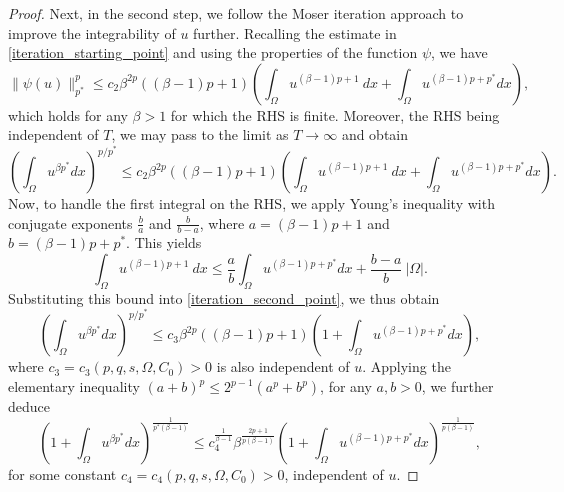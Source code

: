 \documentclass[reqno,oneside]{amsart}
\theoremstyle{definition}
\theoremstyle{remark}
\numberwithin{equation}{section}
\newcommand{\Om} {\Omega}
\newcommand{\rar}{\rightarrow}
\begin{document}
\begin{proof}
    Next, in the second step, we follow the Moser iteration approach to improve the integrability of $u$ further. Recalling the estimate in \eqref{iteration_starting_point} and using the properties of the function $\psi$, we have
    \begin{equation}
        \|\psi (u)\|^p_{p^*} \leq c_2 \beta^{2p} \left((\beta -1)p +1 \right) \left( \int_{\Om} u^{(\beta -1)p +1}\ dx + \int_{\Om} u^{(\beta -1)p + p^*} dx \right),
    \end{equation}
    which holds for any $\beta>1$ for which the RHS is finite. Moreover, the RHS being independent of $T$, we may pass to the limit as $T\rar\infty$ and obtain
    \begin{equation}\label{iteration_second_point}
        \left( \int_{\Om} u^{\beta p^*} dx \right)^{p/p^*} \leq c_2 \beta^{2p} \left((\beta -1)p +1 \right) \left( \int_{\Om} u^{(\beta -1)p +1}\ dx + \int_{\Om} u^{(\beta -1)p + p^*} dx \right).
    \end{equation}
    Now, to handle the first integral on the RHS, we apply Young's inequality with conjugate exponents $\frac{b}{a}$ and $\frac{b}{b-a}$, where $a= (\beta -1)p +1$ and $b= (\beta -1)p + p^*$. This yields
    \begin{equation}
        \int_{\Om} u^{(\beta -1)p +1}\ dx \leq \frac{a}{b} \int_{\Om} u^{(\beta -1)p + p^*} dx + \frac{b-a}{b}\ |\Om|.
    \end{equation}
    Substituting this bound into \eqref{iteration_second_point}, we thus obtain
    \begin{equation}
        \left( \int_{\Om} u^{\beta p^*} dx \right)^{p/p^*} \leq c_3 \beta^{2p} \left((\beta -1)p +1 \right) \left( 1 + \int_{\Om} u^{(\beta -1)p + p^*} dx \right),
    \end{equation}
    where $c_3 = c_3 \left(p, q,s,\Om,C_0 \right) >0$ is also independent of $u$. Applying the elementary inequality $(a+b)^p \leq 2^{p-1} (a^p + b^p)$, for any $a,b >0$, we further deduce
    \begin{equation}\label{iteration}
        \left( 1+ \int_{\Om} u^{\beta p^*} dx \right)^{\frac{1}{p^* (\beta -1)}} \leq c_4^{\frac{1}{\beta -1}} \beta^{\frac{2p+1}{p(\beta -1)}} \left( 1+ \int_{\Om} u^{(\beta -1)p + p^*} dx \right)^{\frac{1}{p(\beta -1)}},
    \end{equation}
    for some constant $c_4 = c_4 \left(p, q,s,\Om,C_0 \right) >0$, independent of $u$.
    

\end{proof}
\end{document}
